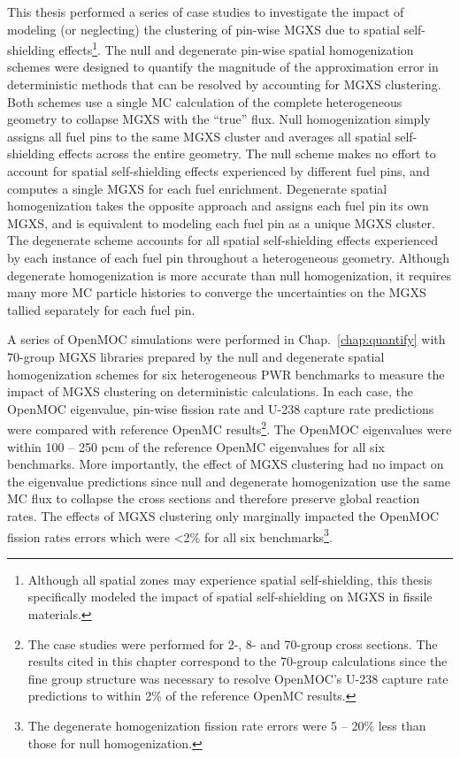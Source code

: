
This thesis performed a series of case studies to investigate the impact of modeling (or neglecting) the clustering of pin-wise \ac{MGXS} due to spatial self-shielding effects\footnote{Although all spatial zones may experience spatial self-shielding, this thesis specifically modeled the impact of spatial self-shielding on MGXS in fissile materials.}. The null and degenerate pin-wise spatial homogenization schemes were designed to quantify the magnitude of the approximation error in deterministic methods that can be resolved by accounting for \ac{MGXS} clustering. Both schemes use a single \ac{MC} calculation of the complete heterogeneous geometry to collapse MGXS with the ``true'' flux. Null homogenization simply assigns all fuel pins to the same \ac{MGXS} cluster and averages all spatial self-shielding effects across the entire geometry. The null scheme makes no effort to account for spatial self-shielding effects experienced by different fuel pins, and computes a single \ac{MGXS} for each fuel enrichment. Degenerate spatial homogenization takes the opposite approach and assigns each fuel pin its own \ac{MGXS}, and is equivalent to modeling each fuel pin as a unique \ac{MGXS} cluster. The degenerate scheme accounts for all spatial self-shielding effects experienced by each instance of each fuel pin throughout a heterogeneous geometry. Although degenerate homogenization is more accurate than null homogenization, it requires many more \ac{MC} particle histories to converge the uncertainties on the \ac{MGXS} tallied separately for each fuel pin.

A series of OpenMOC simulations were performed in Chap.~\ref{chap:quantify} with 70-group \ac{MGXS} libraries prepared by the null and degenerate spatial homogenization schemes for six heterogeneous \ac{PWR} benchmarks to measure the impact of \ac{MGXS} clustering on deterministic calculations. In each case, the OpenMOC eigenvalue, pin-wise fission rate and U-238 capture rate predictions were compared with reference OpenMC results\footnote{The case studies were performed for 2-, 8- and 70-group cross sections. The results cited in this chapter correspond to the 70-group calculations since the fine group structure was necessary to resolve OpenMOC's U-238 capture rate predictions to within 2\% of the reference OpenMC results. }. The OpenMOC eigenvalues were within 100 -- 250 \ac{pcm} of the reference OpenMC eigenvalues for all six benchmarks. More importantly, the effect of \ac{MGXS} clustering had no impact on the eigenvalue predictions since null and degenerate homogenization use the same \ac{MC} flux to collapse the cross sections and therefore preserve global reaction rates. The effects of \ac{MGXS} clustering only marginally impacted the OpenMOC fission rates errors which were <2\% for all six benchmarks\footnote{The degenerate homogenization fission rate errors were 5 -- 20\% less than those for null homogenization.}.

